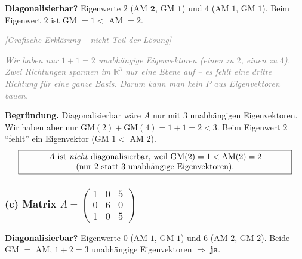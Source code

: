 \documentclass[a4paper,12pt]{article}
\newcommand{\grafik}{\textcolor{gray}{\small\textit{[Grafische Erkl\"arung -- nicht Teil der L\"osung]}}}
\newcommand{\EV}{Eigenvektor}
\begin{document}
\textbf{Diagonalisierbar?} Eigenwerte $2$ (AM $\mathbf{2}$, GM $\mathbf{1}$) und $4$ (AM $1$, GM $1$). Beim Eigenwert $2$ ist GM $= 1 <$ AM $= 2$.

\grafik

\begin{center}
\end{center}

\textcolor{gray}{\small\textit{Wir haben nur $1 + 1 = 2$ unabh\"angige Eigenvektoren (einen zu $2$, einen zu $4$). Zwei Richtungen spannen im $\mathbb{R}^3$ nur eine \emph{Ebene} auf -- es fehlt eine dritte Richtung f\"ur eine ganze Basis. Darum kann man kein $P$ aus Eigenvektoren bauen.}}

\textbf{Begr\"undung.} Diagonalisierbar w\"are $A$ nur mit $3$ unabh\"angigen Eigenvektoren. Wir haben aber nur $\text{GM}(2) + \text{GM}(4) = 1 + 1 = 2 < 3$. Beim Eigenwert $2$ ``fehlt'' ein \EV{} (GM $1 <$ AM $2$).
\[
\fbox{\parbox{0.93\textwidth}{\centering
$A$ ist \emph{nicht} diagonalisierbar, weil $\text{GM}(2) = 1 < \text{AM}(2) = 2$ \\
(nur $2$ statt $3$ unabh\"angige Eigenvektoren).
}}
\]

\subsubsection*{(c) Matrix $A = \left(\begin{smallmatrix} 1 & 0 & 5 \\ 0 & 6 & 0 \\ 1 & 0 & 5 \end{smallmatrix}\right)$}

\textbf{Diagonalisierbar?} Eigenwerte $0$ (AM $1$, GM $1$) und $6$ (AM $2$, GM $2$). Beide GM $=$ AM, $1 + 2 = 3$ unabh\"angige Eigenvektoren $\Rightarrow$ \textbf{ja}.
\end{document}
